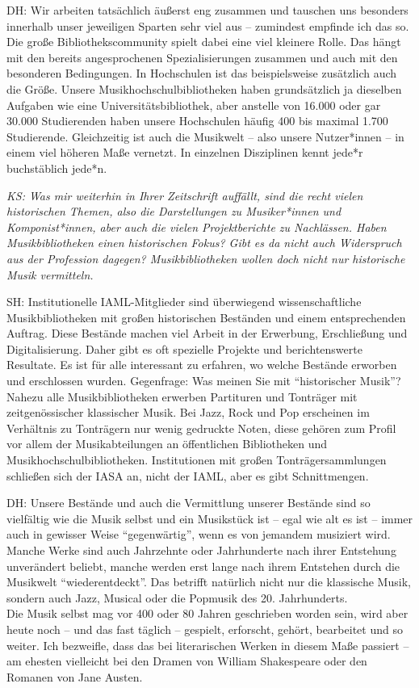 \documentclass[a4paper,
fontsize=11pt,
oneside,
numbers=noperiodatend,
parskip=half-,
bibliography=totoc,
final
]{scrartcl}
\begin{document}
DH: Wir arbeiten tatsächlich äußerst eng zusammen und tauschen uns
besonders innerhalb unser jeweiligen Sparten sehr viel aus -- zumindest
empfinde ich das so. Die große Bibliothekscommunity spielt dabei eine
viel kleinere Rolle. Das hängt mit den bereits angesprochenen
Spezialisierungen zusammen und auch mit den besonderen Bedingungen. In
Hochschulen ist das beispielsweise zusätzlich auch die Größe. Unsere
Musikhochschulbibliotheken haben grundsätzlich ja dieselben Aufgaben wie
eine Universitätsbibliothek, aber anstelle von 16.000 oder gar 30.000
Studierenden haben unsere Hochschulen häufig 400 bis maximal 1.700
Studierende. Gleichzeitig ist auch die Musikwelt -- also unsere
Nutzer*innen -- in einem viel höheren Maße vernetzt. In einzelnen
Disziplinen kennt jede*r buchstäblich jede*n.

\emph{KS: Was mir weiterhin in Ihrer Zeitschrift auffällt, sind die
recht vielen historischen Themen, also die Darstellungen zu
Musiker*innen und Komponist*innen, aber auch die vielen Projektberichte
zu Nachlässen. Haben Musikbibliotheken einen historischen Fokus? Gibt es
da nicht auch Widerspruch aus der Profession dagegen? Musikbibliotheken
wollen doch nicht nur historische Musik vermitteln.}

SH: Institutionelle IAML-Mitglieder sind überwiegend wissenschaftliche
Musikbibliotheken mit großen historischen Beständen und einem
entsprechenden Auftrag. Diese Bestände machen viel Arbeit in der
Erwerbung, Erschließung und Digitalisierung. Daher gibt es oft spezielle
Projekte und berichtenswerte Resultate. Es ist für alle interessant zu
erfahren, wo welche Bestände erworben und erschlossen wurden.
Gegenfrage: Was meinen Sie mit \enquote{historischer Musik}? Nahezu alle
Musikbibliotheken erwerben Partituren und Tonträger mit zeitgenössischer
klassischer Musik. Bei Jazz, Rock und Pop erscheinen im Verhältnis zu
Tonträgern nur wenig gedruckte Noten, diese gehören zum Profil vor allem
der Musikabteilungen an öffentlichen Bibliotheken und
Musikhochschulbibliotheken. Institutionen mit großen Tonträgersammlungen
schließen sich der IASA an, nicht der IAML, aber es gibt Schnittmengen.

DH: Unsere Bestände und auch die Vermittlung unserer Bestände sind so
vielfältig wie die Musik selbst und ein Musikstück ist -- egal wie alt
es ist -- immer auch in gewisser Weise \enquote{gegenwärtig}, wenn es
von jemandem musiziert wird. Manche Werke sind auch Jahrzehnte oder
Jahrhunderte nach ihrer Entstehung unverändert beliebt, manche werden
erst lange nach ihrem Entstehen durch die Musikwelt
\enquote{wiederentdeckt}. Das betrifft natürlich nicht nur die
klassische Musik, sondern auch Jazz, Musical oder die Popmusik des 20.
Jahrhunderts.\\
Die Musik selbst mag vor 400 oder 80 Jahren geschrieben worden sein,
wird aber heute noch -- und das fast täglich -- gespielt, erforscht,
gehört, bearbeitet und so weiter. Ich bezweifle, dass das bei
literarischen Werken in diesem Maße passiert -- am ehesten vielleicht
bei den Dramen von William Shakespeare oder den Romanen von Jane Austen.
\end{document}
